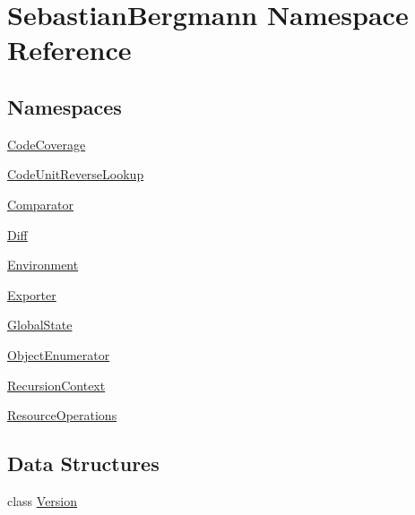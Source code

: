 \hypertarget{namespace_sebastian_bergmann}{}\section{Sebastian\+Bergmann Namespace Reference}
\label{namespace_sebastian_bergmann}
\subsection*{Namespaces}
\begin{DoxyCompactItemize}
\item 
 \mbox{\hyperlink{namespace_sebastian_bergmann_1_1_code_coverage}{Code\+Coverage}}
\item 
 \mbox{\hyperlink{namespace_sebastian_bergmann_1_1_code_unit_reverse_lookup}{Code\+Unit\+Reverse\+Lookup}}
\item 
 \mbox{\hyperlink{namespace_sebastian_bergmann_1_1_comparator}{Comparator}}
\item 
 \mbox{\hyperlink{namespace_sebastian_bergmann_1_1_diff}{Diff}}
\item 
 \mbox{\hyperlink{namespace_sebastian_bergmann_1_1_environment}{Environment}}
\item 
 \mbox{\hyperlink{namespace_sebastian_bergmann_1_1_exporter}{Exporter}}
\item 
 \mbox{\hyperlink{namespace_sebastian_bergmann_1_1_global_state}{Global\+State}}
\item 
 \mbox{\hyperlink{namespace_sebastian_bergmann_1_1_object_enumerator}{Object\+Enumerator}}
\item 
 \mbox{\hyperlink{namespace_sebastian_bergmann_1_1_recursion_context}{Recursion\+Context}}
\item 
 \mbox{\hyperlink{namespace_sebastian_bergmann_1_1_resource_operations}{Resource\+Operations}}
\end{DoxyCompactItemize}
\subsection*{Data Structures}
\begin{DoxyCompactItemize}
\item 
class \mbox{\hyperlink{class_sebastian_bergmann_1_1_version}{Version}}
\end{DoxyCompactItemize}
